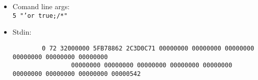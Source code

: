 \documentclass{article}
\begin{document}
\begin{itemize}
	\begin{itemize}
	\item Comand line args:\\
	\texttt{5 "'or true;/*"}
	\item Stdin:\\
	\begin{small}\begin{verbatim}
		0 72 32000000 5FB78862 2C3D0C71 00000000 00000000 00000000 00000000 00000000 00000000
				00000000 00000000 00000000 00000000 00000000 00000000 00000000 00000000 00000542
	\end{verbatim}\end{small}
	\end{itemize}
\end{itemize}
\end{document}
